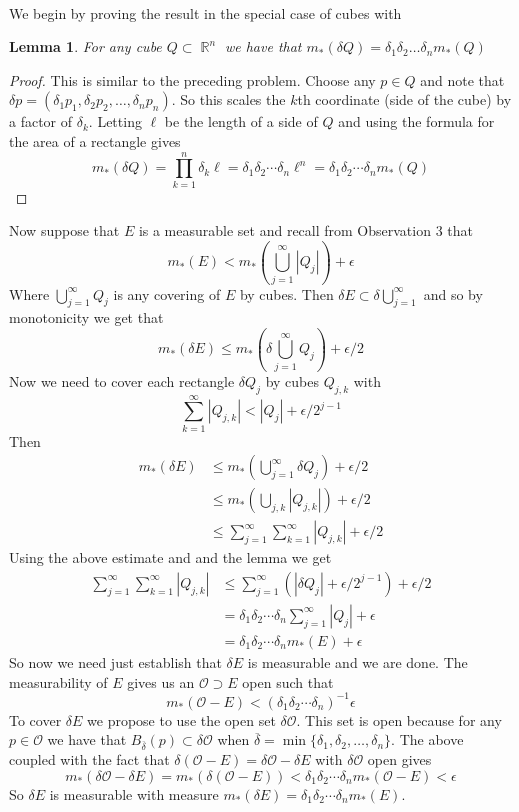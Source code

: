 \documentclass{article}
\DeclareMathOperator{\R}{\mathbb{R}}
\newcommand{\problem}[1]{\noindent{\textbf{Problem #1}}\\}
\newtheorem*{lem}{Lemma}
\begin{document}
\problem{1.6.7} We begin by proving the result in the special case of cubes with \\
\begin{lem}
For any cube $Q \subset \R^n$ we have that $m_*(\delta Q) = \delta_1\delta_2\ldots\delta_nm_*(Q)$
\end{lem}  
\begin{proof}
This is similar to the preceding problem. Choose any $p \in Q$ and note that $\delta p = (\delta_1p_1, \delta_2p_2, \ldots, \delta_np_n)$. So this scales the $k$th coordinate (side of the cube) by a factor of $\delta_k$. Letting $\ell$ be the length of a side of $Q$ and using the formula for the area of a rectangle gives
\[
m_*(\delta Q) = \prod_{k=1}^n \delta_k\ell = \delta_1\delta_2\cdots\delta_n\ell^n = \delta_1\delta_2\cdots\delta_nm_*(Q)
\] 
\end{proof}

Now suppose that $E$ is a measurable set and recall from Observation 3 that
\[
m_*(E) < m_*\left(\bigcup_{j=1}^\infty |Q_j|\right) + \epsilon
\]
Where $\bigcup_{j=1}^\infty Q_j$ is any covering of $E$ by cubes. Then $\delta E \subset \delta\bigcup_{j=1}^\infty$ and so by monotonicity we get that 
\[
m_*(\delta E) \leq m_*\left(\delta\bigcup_{j=1}^\infty Q_j\right) + \epsilon/2
\]
Now we need to cover each rectangle $\delta Q_j$ by cubes $Q_{j,k}$ with 
\[
\sum_{k=1}^\infty |Q_{j,k}| < |Q_j| + \epsilon/2^{j-1}
\]
Then 
\begin{align*}
m_*(\delta E) &\leq m_*(\bigcup_{j=1}^\infty \delta Q_j) + \epsilon/2 \\
&\leq m_*(\bigcup_{j,k}|Q_{j,k}|) + \epsilon/2 \\
&\leq \sum_{j=1}^\infty\sum_{k=1}^\infty |Q_{j,k}| + \epsilon/2
\end{align*}
Using the above estimate and and the lemma we get
\begin{align*}
\sum_{j=1}^\infty\sum_{k=1}^\infty |Q_{j,k}|  &\leq \sum_{j=1}^\infty (|\delta Q_j| + \epsilon/2^{j-1}) + \epsilon/2 \\
&= \delta_1\delta_2\cdots\delta_n\sum_{j=1}^\infty|Q_j| + \epsilon \\
&= \delta_1\delta_2\cdots\delta_nm_*(E) + \epsilon 
\end{align*}
So now we need just establish that $\delta E$ is measurable and we are done. The measurability of $E$ gives us an $\mathcal{O} \supset E$ open such that 
\[
m_*(\mathcal{O} - E) < (\delta_1\delta_2\cdots\delta_n)^{-1} \epsilon
\]
To cover $\delta E$ we propose to use the open set $\delta\mathcal{O}$. This set is open because for any $p\in \mathcal{O}$ we have that $B_{\overline{\delta}}(p) \subset \delta\mathcal{O}$ when $\overline{\delta} = \min\{\delta_1, \delta_2, \ldots, \delta_n\}$. The above coupled with the fact that $\delta(\mathcal{O} - E) = \delta\mathcal{O} - \delta E$ with $\delta\mathcal{O}$ open gives 
\[
m_*(\delta\mathcal{O} - \delta E) = m_*(\delta(\mathcal{O} - E)) < \delta_1\delta_2\cdots\delta_nm_*(\mathcal{O} - E) < \epsilon
\]
So $\delta E$ is measurable with measure $m_*(\delta E) = \delta_1\delta_2\cdots\delta_nm_*(E)$.
\end{document}
